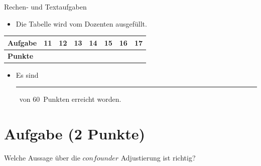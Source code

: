 \documentclass[a4paper, 10pt]{scrartcl}\usepackage[]{graphicx}\usepackage[]{xcolor}
\def\textpoints{60}
\begin{document}
\begin{graybox}{Rechen- und Textaufgaben}
  \begin{itemize}
  \item Die Tabelle wird vom Dozenten ausgef{\"u}llt.
  \end{itemize}
  \begin{center}
    \large
    \begin{tabular}{|l|c|c|c|c|c|c|c|}
      \hline
      \textbf{Aufgabe} & 11 & 12 & 13 & 14 & 15 & 16 & 17 \strut\\
      \hline
      \textbf{Punkte} & \phantom{1111}  & \phantom{1212}  & \phantom{1313}  & \phantom{1414}  & \phantom{1515}  & \phantom{1616}  & \phantom{1717}
                                                                                                                                    \strut\\
      \hline
  \end{tabular}
\end{center}
\begin{itemize}
\item Es sind \rule[0ex]{2em}{.4pt}\, von \textpoints\, Punkten erreicht worden.
\end{itemize}
\end{graybox}

\clearpage


\section{Aufgabe \hfill (2 Punkte)}



Welche Aussage {\"u}ber die \textbf{$confounder$} Adjustierung ist richtig?
\end{document}
